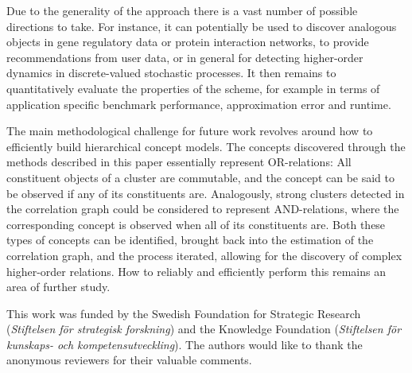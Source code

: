\documentclass{kais}
\begin{document}
Due to the generality of the approach there is a vast number of possible directions to take. For instance, it can 
potentially be used to discover analogous objects in gene regulatory data or protein interaction networks, to provide 
recommendations from user data, or in general for detecting higher-order dynamics in 
discrete-valued stochastic processes. It then remains to quantitatively evaluate the properties of the scheme, for example in 
terms of application specific benchmark performance, approximation error and runtime. 

The main methodological challenge for future work revolves around how to efficiently build hierarchical concept models.
The concepts discovered through the methods described in this paper essentially represent OR-relations: All constituent
objects of a cluster are commutable, and the concept can be said to be observed if any of its constituents
are. Analogously, strong clusters detected in the correlation graph could be considered to represent AND-relations,
where the corresponding concept is observed when all of its constituents are. Both these types of
concepts can be identified, brought back into the estimation of the correlation graph, and the process
iterated, allowing for the discovery of complex higher-order relations. How to reliably and efficiently perform this
remains an area of further study.

\begin{acknowledgements}
This work was funded by the Swedish Foundation for Strategic Research (\emph{Stiftelsen f\"or strategisk forskning}) 
and the Knowledge Foundation (\emph{Stiftelsen f\"or kunskaps- och kompetensutveckling}). 
The authors would like to thank the anonymous reviewers for their valuable comments.\end{acknowledgements}



\end{document}
